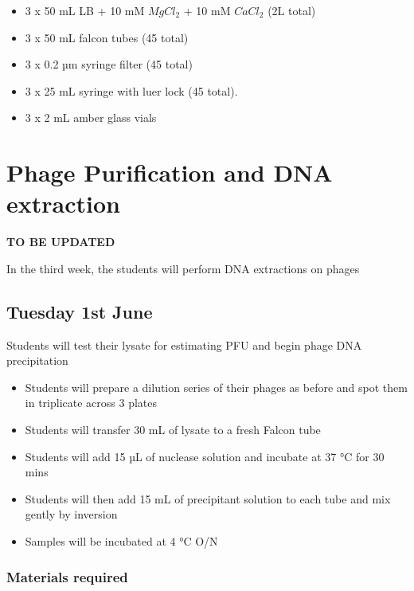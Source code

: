 \documentclass[
]{book}
\providecommand{\tightlist}{%
  \setlength{\itemsep}{0pt}\setlength{\parskip}{0pt}}
\begin{document}
\begin{itemize}
\tightlist
\item
  3 x 50 mL LB + 10 mM \(MgCl_{2}\) + 10 mM \(CaCl_{2}\) (2L total)
\item
  3 x 50 mL falcon tubes (45 total)
\item
  3 x 0.2 µm syringe filter (45 total)
\item
  3 x 25 mL syringe with luer lock (45 total).
\item
  3 x 2 mL amber glass vials
\end{itemize}

\hypertarget{phage-purification-and-dna-extraction}{%
\chapter{Phage Purification and DNA extraction}\label{phage-purification-and-dna-extraction}}

\textbf{TO BE UPDATED}

In the third week, the students will perform DNA extractions on phages

\hypertarget{tuesday-1st-june}{%
\section{Tuesday 1st June}\label{tuesday-1st-june}}

Students will test their lysate for estimating PFU and begin phage DNA precipitation

\begin{itemize}
\tightlist
\item
  Students will prepare a dilution series of their phages as before and spot them in triplicate across 3 plates
\item
  Students will transfer 30 mL of lysate to a fresh Falcon tube
\item
  Students will add 15 µL of nuclease solution and incubate at 37 °C for 30 mins
\item
  Students will then add 15 mL of precipitant solution to each tube and mix gently by inversion
\item
  Samples will be incubated at 4 °C O/N
\end{itemize}

\hypertarget{materials-required-5}{%
\subsection{Materials required}\label{materials-required-5}}
\end{document}
